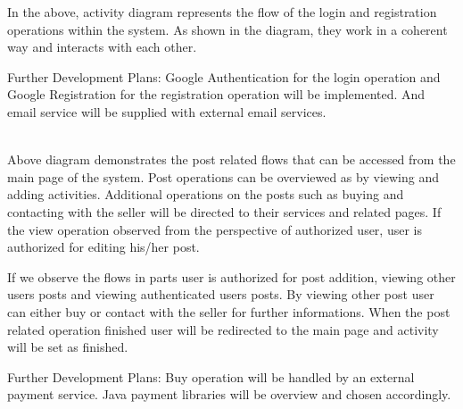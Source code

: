 In the above, activity diagram represents the flow of the login and registration operations within the system. As shown in the diagram, they work in a coherent way and interacts with each other. \newline

Further Development Plans: Google Authentication for the login operation and Google Registration for the registration operation will be implemented. And email service will be supplied with external email services.\newline

\\

Above diagram demonstrates the post related flows that can be accessed from the main page of the system. Post operations can be overviewed as by viewing and adding activities. Additional operations on the posts such as buying and contacting with the seller will be directed to their services and related pages. If the view operation observed from the perspective of authorized user, user is authorized for editing his/her post. \newline

If we observe the flows in parts user is authorized for post addition, viewing other users posts and viewing authenticated users posts. 
By viewing other post user can either buy or contact with the seller for further informations. When the post related operation finished user will be redirected to the main page and activity will be set as finished. \newline

Further Development Plans: Buy operation will be handled by an external payment service. Java payment libraries will be overview and chosen accordingly.\newline

\newline

